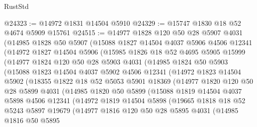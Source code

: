 \begin{lexlean}{RustStd}
\begin{coremodule}
@24323 := @14972 @1831 @14504 @5910
@24329 := @15747 @1830 @18 @52 @4674 @5909 @15761
@24515 := @14977
    @1828
    @120
    @50
    @28
    @5907
    @4031
    (@14985
      @1828
      @50
      @5907
      (@15088
        @1827
        @14504
        @4037
        @5906
        @4506
        @12341
        (@14972
          @1827
          @14504
          @5906
          (@15985
            @1826
            @18
            @52
            @4695
            @5905
            @15999
            (@14977
              @1824
              @120
              @50
              @28
              @5903
              @4031
              (@14985
                @1824
                @50
                @5903
                (@15088
                  @1823
                  @14504
                  @4037
                  @5902
                  @4506
                  @12341
                  (@14972
                    @1823
                    @14504
                    @5902
                    (@18355
                      @1822
                      @18
                      @52
                      @5053
                      @5901
                      @18369
                      (@14977
                        @1820
                        @120
                        @50
                        @28
                        @5899
                        @4031
                        (@14985
                          @1820
                          @50
                          @5899
                          (@15088
                            @1819
                            @14504
                            @4037
                            @5898
                            @4506
                            @12341
                            (@14972
                              @1819
                              @14504
                              @5898
                              (@19665
                                @1818
                                @18
                                @52
                                @5243
                                @5897
                                @19679
                                (@14977
                                  @1816
                                  @120
                                  @50
                                  @28
                                  @5895
                                  @4031
                                  (@14985
                                    @1816
                                    @50
                                    @5895

\end{coremodule}
\end{lexlean}
